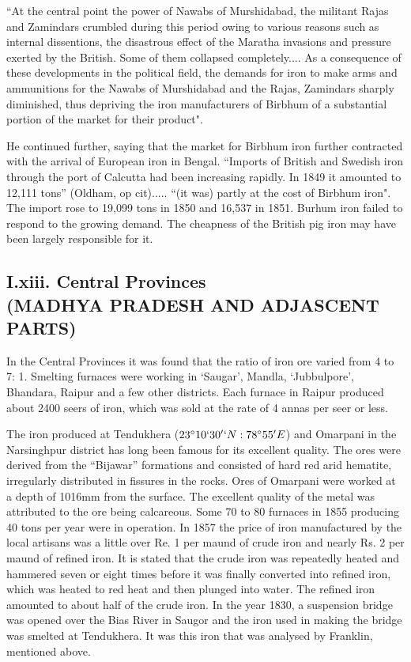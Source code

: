 \newpage

\footnotesize{``At the central point the power of Nawabs of Murshidabad, the militant Rajas and Zamindars crumbled during this period owing to various reasons such as internal dissentions, the disastrous effect of the Maratha invasions and pressure exerted by the British.  Some of them collapsed completely.... As a consequence of these developments in the political field, the demands for iron to make arms and ammunitions for the Nawabs of Murshidabad and the Rajas, Zamindars sharply diminished, thus depriving the iron manufacturers of Birbhum of a substantial portion of the market for their product".}  

He continued further, saying that the market for Birbhum iron further contracted with the arrival of European iron in Bengal.  “Imports of British and Swedish iron through the port of Calcutta had been increasing rapidly.  In 1849 it amounted to 12,111 tons” (Oldham, op cit)..... “(it was) partly at the cost of Birbhum iron".  The import rose to 19,099 tons in 1850 and 16,537 in 1851.  Burhum iron failed to respond to the growing demand.  The cheapness of the British pig iron may have been largely responsible for it.

\vspace{-.3cm}

\subsection*{I.xiii.  Central Provinces\\ (MADHYA PRADESH AND ADJASCENT PARTS)}\label{subsection-13}

\vspace{-.2cm}

In the Central Provinces it was found that the ratio of iron ore varied from 4 to 7: 1. Smelting furnaces were working in ‘Saugar’, Mandla, `Jubbulpore', Bhandara, Raipur and a few other districts. Each furnace in Raipur produced about 2400 seers of iron, which was sold at the rate of 4 annas per seer or less. 

The iron produced at Tendukhera ($23^\circ 10` 30'`N: 78^\circ 55'E$) and Omar\-pani in the Narsinghpur district has long been famous for its excellent quality. The ores were derived from the “Bijawar” formations and consisted of hard red arid hematite, irregularly distributed in fissures in the rocks. Ores of Omarpani were worked at a depth of 1016mm from the surface. The excellent quality of the metal was attributed to the ore being calcareous. Some 70 to 80 furnaces in 1855 producing 40 tons per year were in operation. In 1857 the price of iron manufac\-tured by the local artisans was a little over Re. 1 per maund of crude iron and nearly Rs. 2 per maund of refined iron. It is stated that the crude iron was repeatedly heated and hammered seven or eight times before it was finally converted into refined iron, which was heated to red heat and then plunged into water. The refined iron amounted to about half of the crude iron. In the year 1830, a suspension bridge was opened over the Bias River in Saugor and the iron used in making the bridge was smelted at Tendukhera. It was this iron that was analysed by Franklin, mentioned above.


